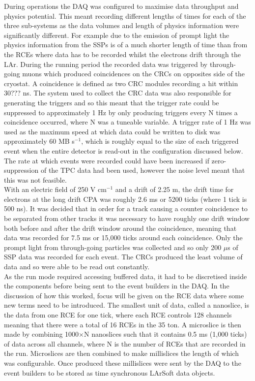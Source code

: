 During operations the DAQ was configured to maximise data throughput and physics potential. This meant recording different lengths of times for each of the three sub-systems as the data volumes and length of physics information were significantly different. For example due to the emission of prompt light the physics information from the SSPs is of a much shorter length of time than from the RCEs where data has to be recorded whilst the electrons drift through the LAr. During the running period the recorded data was triggered by through-going muons which produced coincidences on the CRCs on opposites side of the cryostat. A coincidence is defined as two CRC modules recording a hit within 30??? ns. The system used to collect the CRC data was also responsible for generating the triggers and so this meant that the trigger rate could be suppressed to approximately 1 Hz by only producing triggers every N times a coincidence occurred, where N was a tuneable variable. A trigger rate of 1 Hz was used as the maximum speed at which data could be written to disk was approximately 60 MB s$^{-1}$, which is roughly equal to the size of each triggered event when the entire detector is read-out in the configuration discussed below. The rate at which events were recorded could have been increased if zero-suppression of the TPC data had been used, however the noise level meant that this was not feasible. \\ 

With an electric field of 250 V cm$^{-1}$ and a drift of 2.25 m, the drift time for electrons at the long drift CPA was roughly 2.6 ms or 5200 ticks (where 1 tick is 500 ns). It was decided that in order for a track causing a counter coincidence to be separated from other tracks it was necessary to have roughly one drift window both before and after the drift window around the coincidence, meaning that data was recorded for 7.5 ms or 15,000 ticks around each coincidence. Only the prompt light from through-going particles was collected and so only 200 $\mu$s of SSP data was recorded for each event. The CRCs produced the least volume of data and so were able to be read out constantly. \\

As the run mode required accessing buffered data, it had to be discretised inside the components before being sent to the event builders in the DAQ. In the discussion of how this worked, focus will be given on the RCE data where some new terms need to be introduced. The smallest unit of data, called a nanoslice, is the data from one RCE for one tick, where each RCE controls 128 channels meaning that there were a total of 16 RCEs in the 35 ton. A microslice is then made by combining 1000$\times$N nanoslices such that it contains 0.5 ms (1,000 ticks) of data across all channels, where N is the number of RCEs that are recorded in the run. Microslices are then combined to make millislices the length of which was configurable. Once produced these millislices were sent by the DAQ to the event builders to be stored as time synchronous LArSoft data objects. \\

